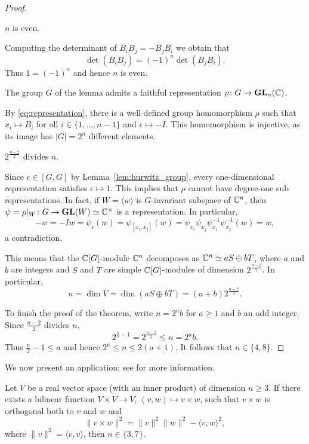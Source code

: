 \begin{proof}
    \begin{claim}
        $n$ is even. 
    \end{claim}
    
	Computing the determinant of 
	$B_iB_j=-B_jB_i$ we obtain that 
	\[
	\det(B_iB_j)=(-1)^n\det(B_jB_i).
	\]
    Thus $1=(-1)^n$ and 
	hence $n$ is even. 

	\begin{claim}
	    The group 
	    $G$ of the lemma admits a faithful
	    representation $\rho\colon G\to\mathbf{GL}_n(\mathbb{C})$. 
	\end{claim}
	
	By \eqref{eq:representation}, there is a well-defined 
	group homomorphism $\rho$ such that 
	$x_i\mapsto B_i$ for all $i\in\{1,\dots,n-1\}$ and 
	$\epsilon\mapsto -I$. This homomorphism 
    is injective, as its image has
    $|G|=2^n$ different elements. 
	
	\begin{claim}
	    $2^{\frac{n-2}{2}}$ divides $n$.
	\end{claim}
	
	Since $\epsilon\in[G,G]$ by Lemma~\ref{lem:hurwitz_group}, 
	every one-dimensional representation satisfies $\epsilon\mapsto 1$.
	This implies that $\rho$ cannot have degree-one sub representations. 
	In fact, 
	if $W=\langle w\rangle$ is $G$-invariant subspace of $\mathbb{C}^n$, 
	then $\psi=\rho|_W\colon G\to\mathbf{GL}(W)\simeq\mathbb{C}^\times$ 
	is a representation. In particular, 
	\[
	-w=-Iw=\psi_{\epsilon}(w)=\psi_{[x_i,x_j]}(w)
	=\psi_{x_i}\psi_{x_j}\psi_{{x_i}}^{-1}\psi_{{x_j}}^{-1}(w)=w, 
	\]
	a contradiction. 
	
	This means that the $\mathbb{C}[G]$-module $\mathbb{C}^n$ 
	decomposes as $\mathbb{C}^n\simeq aS\oplus bT$,
	where $a$ and $b$ are integers and 
	$S$ and $T$ are simple $\mathbb{C}[G]$-modules of dimension
	$2^{\frac{n-2}{2}}$. In particular, 
	\[
	n=\dim V=\dim(aS\oplus bT)=(a+b)2^{\frac{n-2}{2}}.
	\]
	
	To finish the proof of the theorem, write $n=2^ab$ 
	for $a\geq1$ and $b$ an odd integer. 
	Since $\frac{n-2}{2}$ divides $n$, 
	\[
	2^{\frac{n}{2}-1}=2^{\frac{n-2}{2}}\leq n=2^ab. 
	\]
	Thus $\frac{n}{2}-1\leq a$ and hence $2^a\leq n\leq 2(a+1)$. 
	It follows that $n\in\{4,8\}$.  
\end{proof}

We now present an application; see
\cite{MR1534187} for more information. 

\begin{theorem}
	Let $V$ be a real vector space (with an inner product) 
	of dimension $n\geq3$. If there exists a bilinear function 
	$V\times V\to V$, $(v,w)\mapsto v\times
	w$, such that $v\times w$ is orthogonal both 
	to $v$ and $w$ and 
	\[
		\|v\times w\|^2=\|v\|^2\|w\|^2-\langle v,w\rangle^2,
	\]
	where $\|v\|^2=\langle v,v\rangle$, then $n\in\{3,7\}$. 
\end{theorem}

